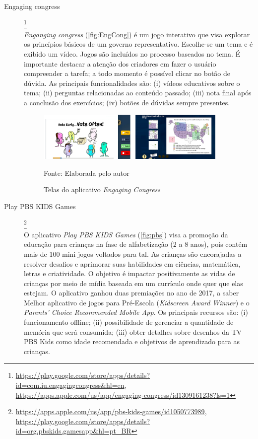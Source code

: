 \begin{description}

\item[Engaging congress]\footnote{\url{https://play.google.com/store/apps/details?id=com.iu.engagingcongress&hl=en}, \url{https://apps.apple.com/us/app/engaging-congress/id1309161238?ls=1}} \hfill \\
\textit{Enganging congress} (\autoref{fig:EngCong}) é um jogo interativo que visa explorar os princípios básicos de um governo representativo. Escolhe-se um tema e é exibido um vídeo. Jogos são incluídos no processo baseados no tema. É importante destacar a atenção dos criadores em fazer o usuário compreender a tarefa; a todo momento é possível clicar no botão de dúvida. As principais funcionalidades são: (i) vídeos educativos sobre o tema; (ii) perguntas relacionadas ao conteúdo passado; (iii) nota final após a conclusão dos exercícios; (iv) botões de dúvidas sempre presentes.

\begin{figure}[ht!]
\centering
    \caption{Telas do aplicativo \textit{Engaging Congress}}
    \label{fig:EngCong}
    \includegraphics[width=0.9\textwidth]{Figuras/engagingcongress.png}
    
    Fonte: Elaborada pelo autor
\end{figure}

\item[Play PBS KIDS Games]\footnote{\url{https://apps.apple.com/us/app/pbs-kids-games/id1050773989}, \url{https://play.google.com/store/apps/details?id=org.pbskids.gamesapp&hl=pt_BR}} \hfill \\
O aplicativo \textit{Play PBS KIDS Games} (\autoref{fig:pbs}) visa a promoção da educação para crianças na fase de alfabetização (2 a 8 anos), pois contém mais de 100 mini-jogos voltados para tal. As crianças são encorajadas a resolver desafios e aprimorar suas habilidades em ciências, matemática, letras e criatividade. O objetivo é impactar positivamente as vidas de crianças por meio de mídia baseada em um currículo onde quer que elas estejam. O aplicativo ganhou duas premiações no ano de 2017, a saber Melhor aplicativo de jogos para Pré-Escola (\textit{Kidscreen Award Winner}) e o \textit{Parents' Choice Recommended Mobile App}. Os principais recursos são: (i) funcionamento offline; (ii) possibilidade de gerenciar a quantidade de memória que será consumida; (iii) obter detalhes sobre desenhos da TV PBS Kids como idade recomendada e objetivos de aprendizado para as crianças.


\end{description}
